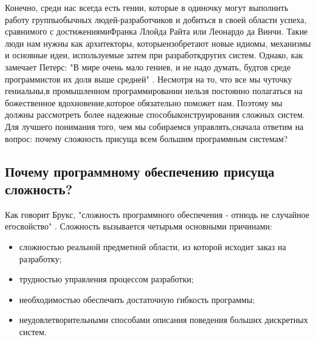 \documentclass[11pt]{article}
\begin{document}
Конечно, среди нас всегда есть гении, которые в одиночку могут выполнить работу группы\linebreak обычных людей-разработчиков и добиться в своей области успеха, сравнимого с достижениями\linebreak Франка Ллойда Райта или Леонардо да Винчи. Такие люди нам нужны как архитекторы, которые\linebreak изобретают новые идиомы, механизмы и основные идеи, используемые затем при разработк других систем. Однако, как замечает Петерс: "В мире очень мало гениев, и не надо думать, будто\linebreak в среде программистов их доля выше средней" \cite{n2}. Несмотря на то, что все мы чуточку гениальны,\linebreak в промышленном программировании нельзя постоянно полагаться на божественное вдохновение,\linebreak которое обязательно поможет нам. Поэтому мы должны рассмотреть более надежные способы\linebreak конструирования сложных систем. Для лучшего понимания того, чем мы собираемся управлять,\linebreak сначала ответим на вопрос: почему сложность присуща всем большим программным системам? 

\subsection{Почему программному обеспечению присуща сложность? }
Как говорит Брукс, "сложность программного обеспечения - отнюдь не случайное его\linebreak свойство" \cite{n3}. Сложность вызывается четырьмя основными причинами: 
\begin{itemize}
\item сложностью реальной предметной области, из которой исходит заказ на разработку;
\item трудностью управления процессом разработки;
\item необходимостью обеспечить достаточную гибкость программы;
\item неудовлетворительными способами описания поведения больших дискретных систем.
\end{itemize} \bigskip
\end{document}
